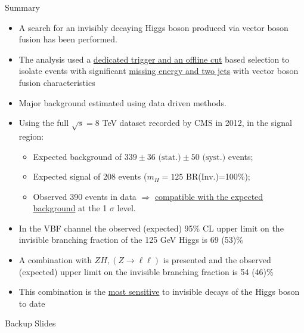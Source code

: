 \documentclass[8pt]{beamer}
\newcommand{\stat}{\text{ (stat.)}}
\newcommand{\syst}{\text{ (syst.)}}
\begin{document}
\begin{frame}{Summary}

\begin{block}

\begin{itemize}
 \item A search for an invisibly decaying Higgs boson produced via vector boson fusion has been performed. 
 \item The analysis used a \uline{dedicated trigger and an offline cut} based selection to isolate events with significant \uline{missing energy and two jets} with vector boson fusion characteristics
 \item Major background estimated using data driven methods.  
 \item Using the full $\sqrt{s}=8$ TeV dataset recorded by CMS in 2012, in the signal region:
 \begin{itemize}
  \item Expected background of $339 \pm 36 \stat \pm 50 \syst$ events;
  \item Expected signal of 208 events ($m_H = 125$ BR(Inv.)=100\%);
  \item Observed 390 events in data $\Rightarrow$ \uline{compatible with the expected background} at the 1 $\sigma$ level.
 \end{itemize}
 \item In the VBF channel the observed (expected) 95\% CL upper limit on the invisible branching fraction of the 125 GeV Higgs is 69 (53)\%
 \item A combination with $ZH, (Z \rightarrow \ell\ell)$ is presented and the observed (expected) upper limit on the invisible branching fraction is 54 (46)\%
 \item This combination is the \uline{most sensitive} to invisible decays of the Higgs boson to date
\end{itemize}

\end{block}

\end{frame}

\appendix
\begin{frame}
 
\begin{block}

\begin{center}Backup Slides\end{center}

\end{block}

\end{frame}
\end{document}

